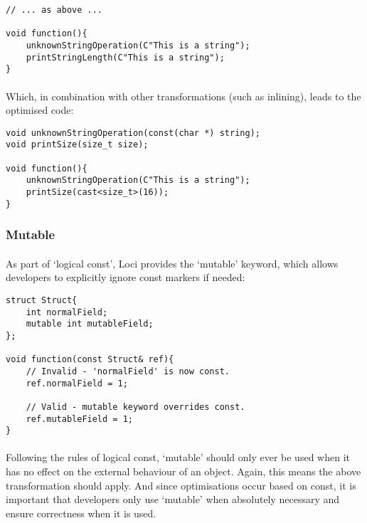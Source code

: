 \documentclass[12pt,twoside,notitlepage]{report}
\begin{document}
\begin{lstlisting}
// ... as above ...

void function(){
	unknownStringOperation(C"This is a string");
	printStringLength(C"This is a string");
}
\end{lstlisting}

\paragraph{}
Which, in combination with other transformations (such as inlining), leads to the optimised code:

\begin{lstlisting}
void unknownStringOperation(const(char *) string);
void printSize(size_t size);

void function(){
	unknownStringOperation(C"This is a string");
	printSize(cast<size_t>(16));
}
\end{lstlisting}

\subsubsection{Mutable}

\paragraph{}
As part of `logical const', Loci provides the `mutable' keyword, which allows developers to explicitly ignore const markers if needed:

\begin{lstlisting}
struct Struct{
	int normalField;
	mutable int mutableField;
};

void function(const Struct& ref){
	// Invalid - 'normalField' is now const.
	ref.normalField = 1;
	
	// Valid - mutable keyword overrides const.
	ref.mutableField = 1;
}
\end{lstlisting}

\paragraph{}
Following the rules of logical const, `mutable' should only ever be used when it has no effect on the external behaviour of an object. Again, this means the above transformation should apply. And since optimisations occur based on const, it is important that developers only use `mutable' when absolutely necessary and ensure correctness when it is used.
\end{document}
